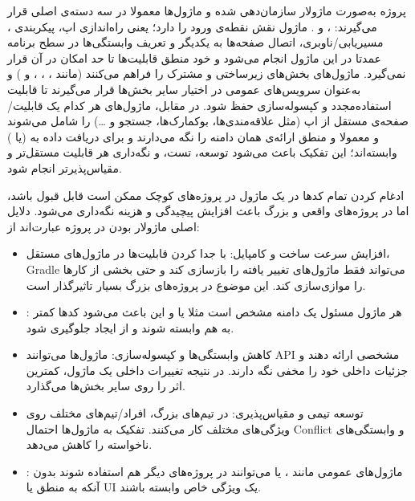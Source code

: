 پروژه  به‌صورت ماژولار سازمان‌دهی شده و ماژول‌ها معمولا در سه دسته‌ی اصلی قرار می‌گیرند: ،  و . ماژول  نقش نقطه‌ی ورود را دارد؛ یعنی راه‌اندازی اپ، پیکربندی ، مسیریابی/ناوبری، اتصال صفحه‌ها به یکدیگر و تعریف وابستگی‌ها در سطح برنامه عمدتا در این ماژول انجام می‌شود و خود منطق قابلیت‌ها تا حد امکان در آن قرار نمی‌گیرد. ماژول‌های  بخش‌های زیرساختی و مشترک را فراهم می‌کنند (مانند ، ، ،  و ) و به‌عنوان سرویس‌های عمومی در اختیار سایر بخش‌ها قرار می‌گیرند تا قابلیت استفاده‌مجدد و کپسوله‌سازی حفظ شود. در مقابل، ماژول‌های  هر کدام یک قابلیت/صفحه‌ی مستقل از اپ (مثل علاقه‌مندی‌ها، بوکمارک‌ها، جستجو و …) را شامل می‌شوند و معمولا  و منطق ارائه‌ی همان دامنه را نگه می‌دارند و برای دریافت داده به  (یا ) وابسته‌اند؛ این تفکیک باعث می‌شود توسعه، تست، و نگه‌داری هر قابلیت مستقل‌تر و مقیاس‌پذیرتر انجام شود.



ادغام کردن تمام کدها در یک ماژول  در پروژه‌های کوچک ممکن است قابل قبول باشد، اما در پروژه‌های واقعی و بزرگ باعث افزایش پیچیدگی و هزینه نگه‌داری می‌شود. دلایل اصلی ماژولار بودن در پروژه  عبارت‌اند از:

\begin{itemize}
  \item {افزایش سرعت ساخت و کامپایل:}
  با جدا کردن قابلیت‌ها در ماژول‌های مستقل، Gradle می‌تواند فقط ماژول‌های تغییر یافته را بازسازی کند و حتی بخشی از کارها را موازی‌سازی کند. این موضوع در پروژه‌های بزرگ بسیار تاثیرگذار است.

  \item {:}
  هر ماژول مسئول یک دامنه مشخص است مثلا  یا
  \linebreak
   و این باعث می‌شود کدها کمتر به هم وابسته شوند و از ایجاد  جلوگیری شود.

  \item {کاهش وابستگی‌ها و کپسوله‌سازی:}
  ماژول‌ها می‌توانند API مشخصی ارائه دهند و جزئیات داخلی خود را مخفی نگه دارند. در نتیجه تغییرات داخلی یک ماژول، کمترین اثر را روی سایر بخش‌ها می‌گذارد.

  \item {توسعه تیمی و مقیاس‌پذیری:}
  در تیم‌های بزرگ، افراد/تیم‌های مختلف روی ویژگی‌های مختلف کار می‌کنند. تفکیک به ماژول‌ها احتمال Conflict و وابستگی‌های ناخواسته را کاهش می‌دهد.

  \item {:}
  ماژول‌های عمومی مانند ،  یا  می‌توانند در پروژه‌های دیگر هم استفاده شوند بدون آنکه به منطق یا UI یک ویژگی خاص وابسته باشند.
\end{itemize}

